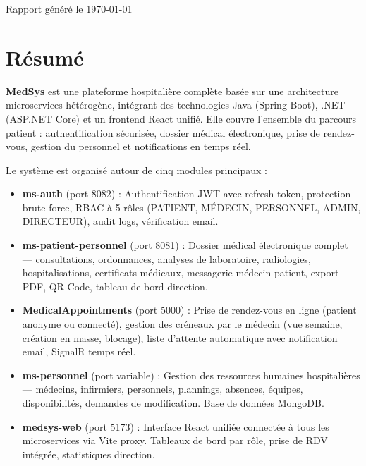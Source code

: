 \documentclass[12pt,a4paper]{report}
\newcommand{\tech}[1]{\textbf{\textcolor{medsysdark}{#1}}}
\begin{document}
\begin{titlepage}
  \vfill
  {\small\color{medsysgray} Rapport généré le \today\par}
\end{titlepage}

\chapter*{Résumé}

\begin{infobox}
\textbf{MedSys} est une plateforme hospitalière complète basée sur une architecture
microservices hétérogène, intégrant des technologies Java (Spring Boot), .NET
(ASP.NET Core) et un frontend React unifié. Elle couvre l'ensemble du parcours
patient : authentification sécurisée, dossier médical électronique, prise de
rendez-vous, gestion du personnel et notifications en temps réel.
\end{infobox}

\vspace{0.5cm}

\noindent Le système est organisé autour de cinq modules principaux :

\begin{itemize}[leftmargin=*, itemsep=4pt]
  \item \tech{ms-auth} (port 8082) : Authentification JWT avec refresh token, protection
    brute-force, RBAC à 5 rôles (PATIENT, MÉDECIN, PERSONNEL, ADMIN, DIRECTEUR),
    audit logs, vérification email.

  \item \tech{ms-patient-personnel} (port 8081) : Dossier médical électronique complet —
    consultations, ordonnances, analyses de laboratoire, radiologies, hospitalisations,
    certificats médicaux, messagerie médecin-patient, export PDF, QR Code, tableau de bord direction.

  \item \tech{MedicalAppointments} (port 5000) : Prise de rendez-vous en ligne (patient
    anonyme ou connecté), gestion des créneaux par le médecin (vue semaine, création en masse,
    blocage), liste d'attente automatique avec notification email, SignalR temps réel.

  \item \tech{ms-personnel} (port variable) : Gestion des ressources humaines hospitalières —
    médecins, infirmiers, personnels, plannings, absences, équipes, disponibilités,
    demandes de modification. Base de données MongoDB.

  \item \tech{medsys-web} (port 5173) : Interface React unifiée connectée à tous les
    microservices via Vite proxy. Tableaux de bord par rôle, prise de RDV intégrée,
    statistiques direction.
\end{itemize}
\end{document}
